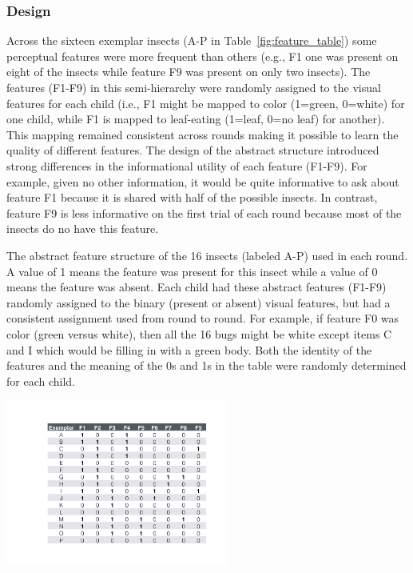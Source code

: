 \documentclass[man,floatsintext]{apa6}
\begin{document}
\subsubsection{Design}

Across the sixteen exemplar insects (A-P in Table~\ref{fig:feature_table}) some perceptual features were more frequent than others (e.g., F1 one was present on eight of the insects while feature F9 was present on only two insects). The features (F1-F9) in this semi-hierarchy were randomly assigned to the visual features for each 
child (i.e., F1 might be mapped to color (1=green, 0=white) for one child, while F1 is mapped to leaf-eating (1=leaf, 0=no leaf) for another).  This mapping remained consistent across rounds making it possible to learn the quality of different features.
The design of the abstract structure introduced strong differences in the informational utility of each feature (F1-F9).  
For example, given no other information, it would be quite informative to ask about feature F1
because it is shared with half of the possible insects.  In contrast, feature
F9 is less informative on the first trial of each round because most of the insects do no have this feature. 

\begin{table}[h]
  \centering
  \caption{The abstract feature structure of the 16 insects (labeled A-P) used in each round.   A value of 1 means
  the feature was present for this insect while a value of 0 means the feature was absent.
Each child had these abstract features (F1-F9) randomly assigned to the binary (present or absent) visual 
features, but had a consistent assignment used from round to round. For example, if feature F0 was
color (green versus white), then all the 16 bugs might be white except items C and I which would be 
filling in with a green body.  Both the identity of the features and the meaning of the 0s and 1s in the table
were randomly determined for each child.}
\includegraphics[width=0.55\textwidth]{figures/feature_table}
  \label{fig:feature_table}
\end{table} 
\end{document}
